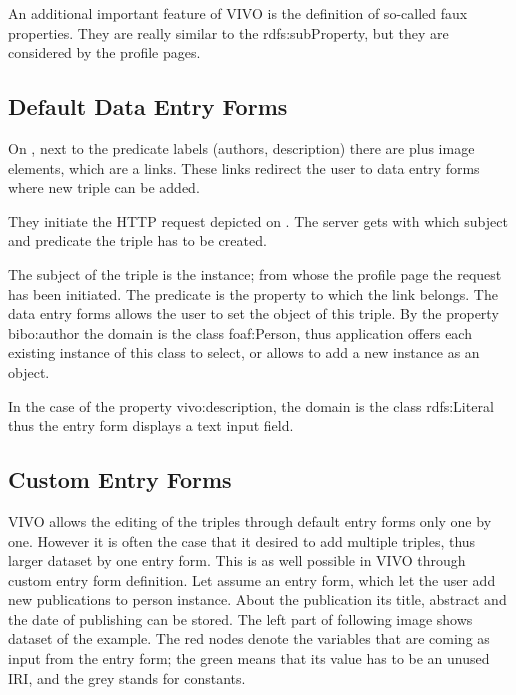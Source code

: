 
An additional important feature of VIVO is the definition of so-called faux properties. They are really similar to the rdfs:subProperty, but they are considered by the profile pages.

\subsection{Default Data Entry Forms}

On , next to the predicate labels (authors, description) there are plus image elements, which are a links. These links redirect the user to data entry forms where new triple can be added. 


They initiate the HTTP request depicted on . The server gets with which subject and predicate the triple has to be created.

The subject of the triple is the instance; from whose the profile page the request has been initiated. The predicate is the property to which the link belongs. The data entry forms allows the user to set the object of this triple. By the property bibo:author the domain is the class foaf:Person, thus application offers each existing instance of this class to select, or allows to add a new instance as an object. 


In the case of the property vivo:description, the domain is the class rdfs:Literal thus the entry form displays a text input field.



\subsection{Custom Entry Forms} \label{vivoCef}

VIVO allows the editing of the triples through default entry forms only one by one. However it is often the case that it desired to add multiple triples, thus larger dataset by one entry form. This is as well possible in VIVO through custom entry form definition.
Let assume an entry form, which let the user add new publications to person instance. About the publication its title, abstract and the date of publishing can be stored. The left part of following image shows dataset of the example. The red nodes denote the variables that are coming as input from the entry form; the green means that its value has to be an unused IRI, and the grey stands for constants. 

